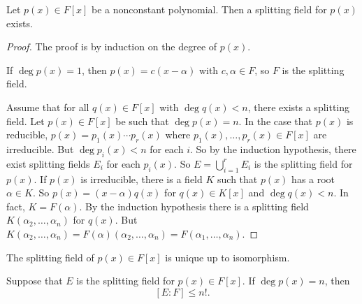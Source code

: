 \begin{theorem}
	Let $p(x)\in F[x]$ be a nonconstant polynomial. Then a splitting field for $p(x)$ exists.
\end{theorem}

\begin{proof}
	The proof is by induction on the degree of $p(x)$.

	If $\deg p(x)=1$, then $p(x)=c(x-\alpha)$ with $c,\alpha\in F$, so $F$ is the splitting field.

	Assume that for all $q(x)\in F[x]$ with $\deg q(x)<n$, there exists a splitting field. Let $p(x)\in F[x]$ be such that $\deg p(x)=n$. In the case that $p(x)$ is reducible, $p(x)=p_1(x)\cdots p_r(x)$ where $p_1(x),\hdots,p_r(x)\in F[x]$ are irreducible. But $\deg p_i(x)<n$ for each $i$. So by the induction hypothesis, there exist splitting fields $E_i$ for each $p_i(x)$. So $E=\bigcup_{i=1}^rE_i$ is the splitting field for $p(x)$. If $p(x)$ is irreducible, there is a field $K$ such that $p(x)$ has a root $\alpha\in K$. So $p(x)=(x-\alpha)q(x)$ for $q(x)\in K[x]$ and $\deg q(x)<n$. In fact, $K=F(\alpha)$. By the induction hypothesis there is a splitting field $K(\alpha_2,\hdots,\alpha_n)$ for $q(x)$. But $K(\alpha_2,\hdots,\alpha_n)=F(\alpha)(\alpha_2,\hdots,\alpha_n)=F(\alpha_1,\hdots,\alpha_n)$.
\end{proof}

\begin{theorem}
	The splitting field of $p(x)\in F[x]$ is unique up to isomorphism.
\end{theorem}

\begin{theorem}
	Suppose that $E$ is the splitting field for $p(x)\in F[x]$. If $\deg p(x)=n$, then
	$$[E:F]\leq n!.$$
\end{theorem}